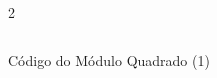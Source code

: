 \begin{figure}[H]
    \centering   
    \begin{tcolorbox}  
        \begin{multicols}{2} 
        \fontsize{9pt}{9pt}\selectfont\inputminted[obeytabs=true,tabsize=4,xleftmargin=20pt,linenos,breaklines,lastline=95]{VHDL}{VHDL/files/Square.vhd}    
        \end{multicols}
    \end{tcolorbox}   
    \caption{Código do Módulo Quadrado (1)}
\end{figure}